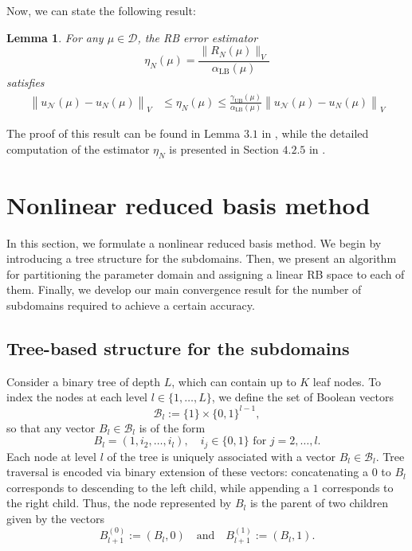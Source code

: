 \documentclass[12pt]{article}
\newtheorem{lemma}{Lemma}[section]
\theoremstyle{remark}
\theoremstyle{definition}
\numberwithin{equation}{section}
\begin{document}
Now, we can state the following result:
\begin{lemma}
    For any $\mu \in \mathcal{D}$, the RB error estimator 
    \begin{equation}
        \eta_N(\mu)=\frac{\|R_N(\mu)\|_V}{\alpha_{\mathrm{LB}}(\mu)}
        \label{bd def}
    \end{equation}
    satisfies 
    \begin{align}
        \label{est}
        \left\|u_{\mathcal{N}}(\mu)-u_N(\mu)\right\|_V & \leq \eta_N(\mu)\leq \frac{  \gamma_{\mathrm{UB}}(\mu)}{\alpha_{\mathrm{LB}}(\mu)} \left\|u_{\mathcal{N}}(\mu)-u_N(\mu)\right\|_V
    \end{align}
    \label{lemma}
\end{lemma}
\noindent The proof of this result can be found in Lemma $3.1$ in \cite{eftang2010hp}, while the detailed computation of the estimator $\eta_N$ is presented in Section $4.2.5$ in \cite{hesthaven2016certified}.

\section{Nonlinear reduced basis method}

In this section, we formulate a nonlinear reduced basis method. We begin by introducing a tree structure for the subdomains. Then, we present an algorithm for partitioning the parameter domain and assigning a linear RB space to each of them. Finally, we develop our main convergence result for the number of subdomains required to achieve a certain accuracy.

\subsection{Tree-based structure for the subdomains}
Consider a binary tree of depth \( L \), which can contain up to  $K$ leaf nodes. To index the nodes at each level \( l \in \{1, \dots, L\} \), we define the set of Boolean vectors
\begin{equation}
    \mathcal{B}_l := \{1\} \times \{0,1\}^{l-1},
\end{equation}
so that any vector \( B_l \in \mathcal{B}_l \) is of the form
\begin{equation}
    B_l = (1, i_2, \dots, i_l), \quad i_j \in \{0,1\} \text{ for } j = 2, \dots, l.
\end{equation}
Each node at level \( l \) of the tree is uniquely associated with a vector \( B_l \in \mathcal{B}_l \). Tree traversal is encoded via binary extension of these vectors: concatenating a $0$ to \( B_l \) corresponds to descending to the left child, while appending a $1$ corresponds to the right child. Thus, the node represented by \( B_l \) is the parent of two children given by the vectors
\begin{equation}
    B_{l+1}^{(0)} := (B_l, 0) \quad \text{and} \quad B_{l+1}^{(1)} := (B_l, 1).
\end{equation}
\end{document}

